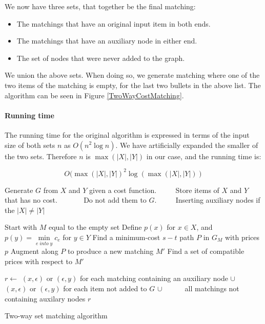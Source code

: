 \documentclass[11pt]{article}
\begin{document}
\endgroup

We now have three sets, that together be the final matching:
\begin{itemize}
   \item The matchings that have an original input item in both ends.
   \item The matchings that have an auxiliary node in either end.
   \item The set of nodes that were never added to the graph.
\end{itemize}

We union the above sets. When doing so, we generate matching where one of the two items of the matching is empty, for the last two bullets in the above list. The algorithm can be seen in Figure \ref{TwoWayCostMatching}.

\paragraph{Running time} The running time for the original algorithm is expressed in terms of the input size of both sets $n$ as $O(n^2 \log n)$. We have artificially expanded the smaller of the two sets. Therefore $n$ is $\max(|X|, |Y|)$ in our case, and the running time is:

\begin{equation}
O(\max(|X|, |Y|)^2 \log (\max(|X|, |Y|)) \nonumber
\end{equation}

\begin{algorithm}
\begin{algorithmic}
	\State Generate $G$ from $X$ and $Y$ given a cost function.
	\State ~~~~ Store items of $X$ and $Y$ that has no cost.
	\State ~~~~~~ Do not add them to $G$.
	\State ~~~~ Inserting auxiliary nodes if the $|X| \neq |Y|$


	\State Start with $M$ equal to the empty set
	\State Define $p(x)$ for $x \in X$, and  $p(y) = \underset{e \; into \; y}{\operatorname{min}} c_e$ for $y \in Y$
    	\State Find a minimum-cost $s-t$ path $P$ in $G_M$ with prices $p$
    	\State Augment along $P$ to produce a new matching $M'$
    	\State Find a set of compatible prices with respect to $M'$
    \EndWhile
    
	\State $r \gets $  $(x, \epsilon)$ or $(\epsilon, y)$ for each matching containing an auxiliary node $\cup$
    \State ~~~~~ $(x, \epsilon)$ or $(\epsilon, y)$ for each item not added to $G$ $\cup$
    \State ~~~~~ all matchings not containing auxilary nodes 
    \State \Return $r$
\EndFunction
\end{algorithmic}
\caption{Two-way set matching algorithm}
\label{TwoWayCostMatching}
\end{algorithm}
\end{document}
